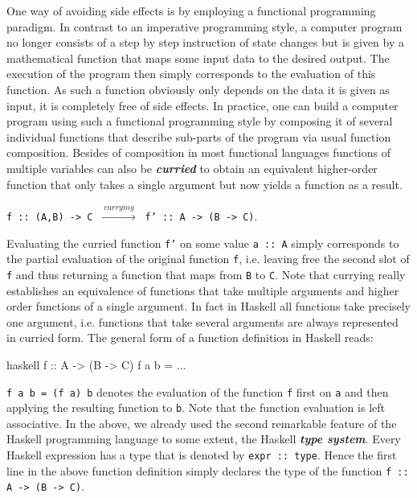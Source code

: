 \documentclass[a4paper,12pt, DIV=14, BCOR=5mm, twoside, headsepline, numbers=noenddot]{scrbook}
\begin{document}
One way of avoiding side effects is by employing a functional programming paradigm. In contrast to an imperative programming style, a computer program no longer consists of a step by step instruction of state changes but is given by a mathematical function that maps some input data to the desired output. The execution of the program then simply corresponds to the evaluation of this function. As such a function obviously only depends on the data it is given as input, it is completely free of side effects. In practice, one can build a computer program using such a functional programming style by composing it of several individual functions that describe sub-parts of the program via usual function composition. Besides of composition in most functional languages functions of multiple variables can also be  \textit{\textbf{curried}} to obtain an equivalent higher-order function that only takes a single argument but now yields a function as a result. 
\begin{center}
    \texttt{f :: (A,B) -> C} $\ \xrightarrow{ \ currying \ } \ $
    \texttt{f' :: A -> (B -> C)}.
\end{center}
Evaluating the curried function \texttt{f'} on some value \texttt{a :: A} simply corresponds to the partial evaluation of the original function \texttt{f}, i.e. leaving free the second slot of \texttt{f} and thus returning a function that maps from \texttt{B}  to \texttt{C}. Note that currying really establishes an equivalence of functions that take multiple arguments and higher order functions of a single argument.
In fact in Haskell all functions take precisely one argument, i.e. functions that take several arguments are always represented in curried form. The general form of a function definition in Haskell reads:
\begin{center}
\begin{cminted}{haskell}
f :: A -> (B -> C)
f a b = ...  
\end{cminted}
\end{center}
\texttt{f a b = (f a) b} denotes the evaluation of the function \texttt{f} first on \texttt{a} and then applying the resulting function to \texttt{b}. Note that the function evaluation is left associative.
In the above, we already used the second remarkable feature of the  Haskell programming language to some extent, the Haskell \textbf{\textit{type system}}. Every Haskell expression has a type that is denoted by \texttt{expr :: type}. Hence the first line in the above function definition simply declares   the type of the function \texttt{f :: A -> (B -> C)}.
\end{document}
